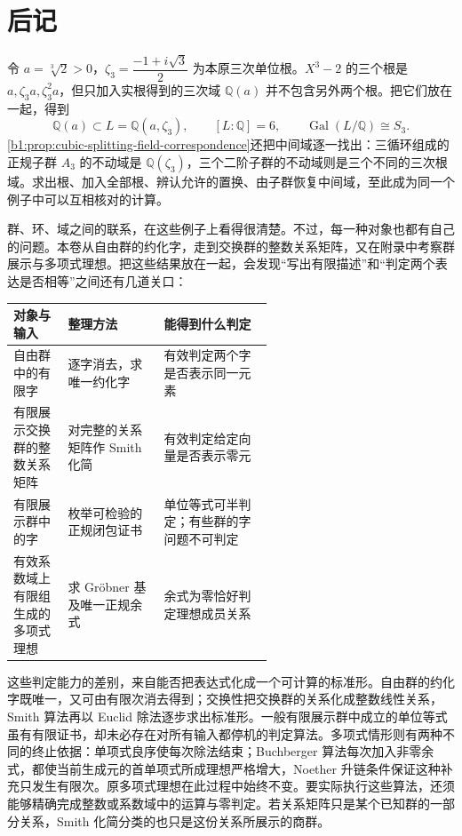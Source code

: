 \chapter*{后记}

令 \(a=\sqrt[3]2>0\)，\(\zeta_3=\dfrac{-1+i\sqrt3}2\) 为本原三次单位根。\(X^3-2\) 的三个根是 \(a,\zeta_3a,\zeta_3^2a\)，但只加入实根得到的三次域 \(\mathbb Q(a)\) 并不包含另外两个根。把它们放在一起，得到
\[
	\mathbb Q(a)\subset L=\mathbb Q(a,\zeta_3),\qquad [L:\mathbb Q]=6,\qquad \operatorname{Gal}(L/\mathbb Q)\cong S_3.
\]
\cref{b1:prop:cubic-splitting-field-correspondence}还把中间域逐一找出：三循环组成的正规子群 \(A_3\) 的不动域是 \(\mathbb Q(\zeta_3)\)，三个二阶子群的不动域则是三个不同的三次根域。求出根、加入全部根、辨认允许的置换、由子群恢复中间域，至此成为同一个例子中可以互相核对的计算。

\ProseParagraphBreak
群、环、域之间的联系，在这些例子上看得很清楚。不过，每一种对象也都有自己的问题。本卷从自由群的约化字，走到交换群的整数关系矩阵，又在附录中考察群展示与多项式理想。把这些结果放在一起，会发现“写出有限描述”和“判定两个表达是否相等”之间还有几道关口：

\begin{center}
	\small
	\begin{tabularx}{\linewidth}{@{}>{\raggedright\arraybackslash}p{0.21\linewidth}>{\raggedright\arraybackslash}p{0.37\linewidth}>{\raggedright\arraybackslash}X@{}}
		\toprule
		对象与输入 & 整理方法 & 能得到什么判定 \\
		\midrule
		自由群中的有限字 & 逐字消去，求唯一约化字 & 有效判定两个字是否表示同一元素 \\
		有限展示交换群的整数关系矩阵 & 对完整的关系矩阵作 Smith 化简 & 有效判定给定向量是否表示零元 \\
		有限展示群中的字 & 枚举可检验的正规闭包证书 & 单位等式可半判定；有些群的字问题不可判定 \\
		有效系数域上有限组生成的多项式理想 & 求 Gröbner 基及唯一正规余式 & 余式为零恰好判定理想成员关系 \\
		\bottomrule
	\end{tabularx}
\end{center}

\noindent 这些判定能力的差别，来自能否把表达式化成一个可计算的标准形。自由群的约化字既唯一，又可由有限次消去得到；交换性把交换群的关系化成整数线性关系，Smith 算法再以 Euclid 除法逐步求出标准形。一般有限展示群中成立的单位等式虽有有限证书，却未必存在对所有输入都停机的判定算法。多项式情形则有两种不同的终止依据：单项式良序使每次除法结束；Buchberger 算法每次加入非零余式，都使当前生成元的首单项式所成理想严格增大，Noether 升链条件保证这种补充只发生有限次。原多项式理想在此过程中始终不变。要实际执行这些算法，还须能够精确完成整数或系数域中的运算与零判定。若关系矩阵只是某个已知群的一部分关系，Smith 化简分类的也只是这份关系所展示的商群。

